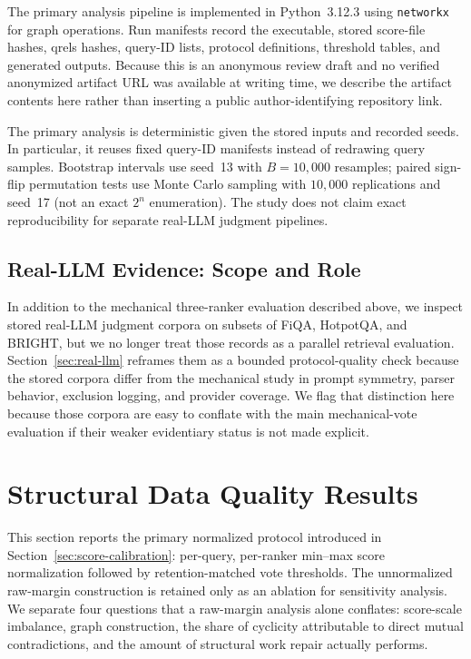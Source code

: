 \documentclass[manuscript,anonymous,review]{acmart}
\begin{document}
The primary analysis pipeline is implemented in Python~3.12.3 using
\texttt{networkx} for graph operations. Run manifests record the executable,
stored score-file hashes, qrels hashes, query-ID lists, protocol definitions,
threshold tables, and generated outputs. Because this is an anonymous review
draft and no verified anonymized artifact URL was available at writing time,
we describe the artifact contents here rather than inserting a public
author-identifying repository link.

The primary analysis is deterministic given the stored inputs and recorded
seeds. In particular, it reuses fixed query-ID manifests instead of redrawing
query samples. Bootstrap intervals use seed~13 with $B=10{,}000$ resamples;
paired sign-flip permutation tests use Monte Carlo sampling with $10{,}000$
replications and seed~17 (not an exact $2^n$ enumeration). The study does not
claim exact reproducibility for separate real-LLM judgment pipelines.

\subsection{Real-LLM Evidence: Scope and Role}
\label{sec:real-llm-scope}

In addition to the mechanical three-ranker evaluation described above, we
inspect stored real-LLM judgment corpora on subsets of FiQA, HotpotQA, and
BRIGHT, but we no longer treat those records as a parallel retrieval evaluation.
Section~\ref{sec:real-llm} reframes them as a bounded protocol-quality check
because the stored corpora differ from the mechanical study in prompt symmetry,
parser behavior, exclusion logging, and provider coverage. We flag that distinction here because those corpora are easy to
conflate with the main mechanical-vote evaluation if their weaker evidentiary
status is not made explicit.

\section{Structural Data Quality Results}
\label{sec:structural-results}

This section reports the primary normalized protocol introduced in
Section~\ref{sec:score-calibration}: per-query, per-ranker min--max score
normalization followed by retention-matched vote thresholds. The unnormalized
raw-margin construction is retained only as an ablation for sensitivity
analysis. We separate four questions that a raw-margin analysis alone
conflates: score-scale imbalance, graph construction, the share of cyclicity
attributable to direct mutual contradictions, and the amount of structural
work repair actually performs.
\end{document}
